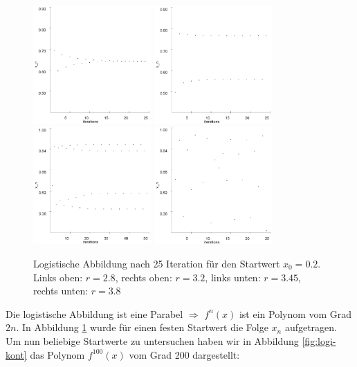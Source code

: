 \documentclass[11,5pt, twoside]{article}
\begin{document}
\begin{figure}[!htbp]
	\centering
	\includegraphics[width=170px]{logi/xn28}
	\includegraphics[width=170px]{logi/xn32}
	\includegraphics[width=170px]{logi/xn345}
	\includegraphics[width=170px]{logi/xn38}
	\caption{Logistische Abbildung nach 25 Iteration für den Startwert $x_0=0.2$. Links oben: $r=2.8$, rechts oben: $r=3.2$, links unten: $r=3.45$, rechts unten: $r=3.8$}
	\label{fig:logi-disk}
\end{figure}
\newline
Die logistische Abbildung ist eine Parabel $\Rightarrow$ $f^n(x)$ ist ein Polynom vom Grad $2n$. 
In Abbildung \ref{fig:logi-disk} wurde für einen festen Startwert die Folge $x_n$ aufgetragen. Um nun  beliebige Startwerte zu untersuchen haben wir in Abbildung \ref{fig:logi-kont} das Polynom $f^{100}(x)$ vom Grad 200 dargestellt: 
\end{document}

